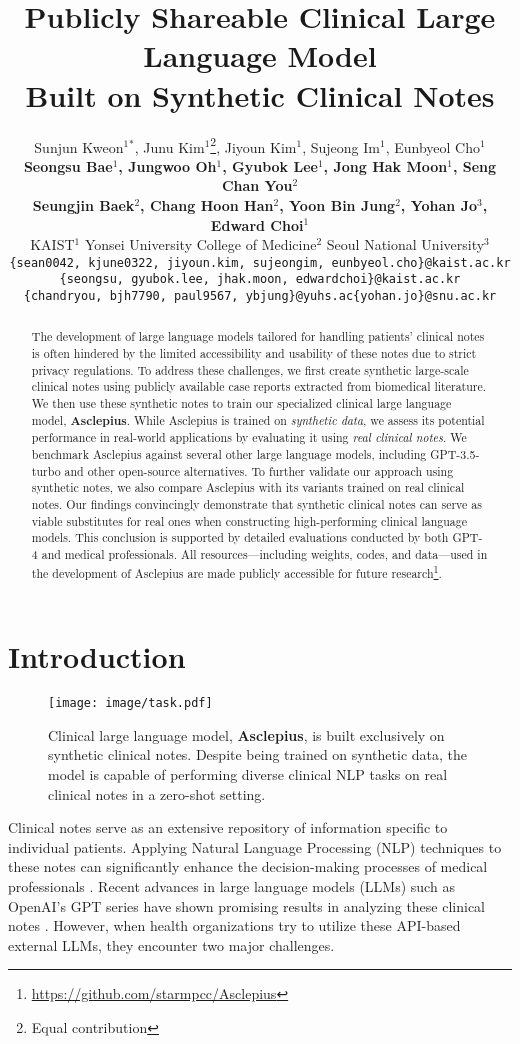 \documentclass[11pt]{article}
\title{Publicly Shareable Clinical Large Language Model\\Built on Synthetic Clinical Notes}
\author{Sunjun Kweon$^{1}$$^{*}$, Junu Kim$^{1}$\thanks{\hspace{0.2cm} Equal contribution}, Jiyoun Kim$^{1}$, Sujeong Im$^{1}$, Eunbyeol Cho$^{1}$\\
    \textbf{Seongsu Bae$^{1}$, Jungwoo Oh$^{1}$, Gyubok Lee$^{1}$, Jong Hak Moon$^{1}$, Seng Chan You$^{2}$}\\
    \textbf{Seungjin Baek$^{2}$, Chang Hoon Han$^{2}$, Yoon Bin Jung$^{2}$, Yohan Jo$^{3}$, Edward Choi$^{1}$}\\
  KAIST$^{1}$ Yonsei University College of Medicine$^{2}$ Seoul National University$^{3}$ \\
  \texttt{\{sean0042, kjune0322, jiyoun.kim, sujeongim, eunbyeol.cho\}@kaist.ac.kr}\\
  \texttt{\{seongsu, gyubok.lee, jhak.moon, edwardchoi\}@kaist.ac.kr}\\
  \texttt{\{chandryou, bjh7790, paul9567, ybjung\}@yuhs.ac}\hspace{0.5cm}\texttt{\{yohan.jo\}@snu.ac.kr} \\ 
  }
\begin{document}
\maketitle
\begin{abstract} 
The development of large language models tailored for handling patients’ clinical notes is often hindered by the limited accessibility and usability of these notes due to strict privacy regulations.
To address these challenges, we first create synthetic large-scale clinical notes using publicly available case reports extracted from biomedical literature.
We then use these synthetic notes to train our specialized clinical large language model, \textbf{Asclepius}.
While Asclepius is trained on \textit{synthetic data}, we assess its potential performance in real-world applications by evaluating it using \textit{real clinical notes}.
We benchmark Asclepius against several other large language models, including GPT-3.5-turbo and other open-source alternatives. 
To further validate our approach using synthetic notes, we also compare Asclepius with its variants trained on real clinical notes. 
Our findings convincingly demonstrate that synthetic clinical notes can serve as viable substitutes for real ones when constructing high-performing clinical language models. 
This conclusion is supported by detailed evaluations conducted by both GPT-4 and medical professionals. 
All resources—including weights, codes, and data—used in the development of Asclepius are made publicly accessible for future research\footnote{\url{https://github.com/starmpcc/Asclepius}}. 
\end{abstract}

\section{Introduction}

\begin{figure}
    \centering
    \texttt{[image: image/task.pdf]}
    \caption{Clinical large language model, \textbf{Asclepius}, is built exclusively on synthetic clinical notes. Despite being trained on synthetic data, the model is capable of performing diverse clinical NLP tasks on real clinical notes in a zero-shot setting.}
    \label{fig:task}
\end{figure}

Clinical notes serve as an extensive repository of information specific to individual patients. Applying Natural Language Processing (NLP) techniques to these notes can significantly enhance the decision-making processes of medical professionals \citep{demner2009can, lederman2022tasks, wu2022survey}.
Recent advances in large language models (LLMs) such as OpenAI's GPT series \citep{brown2020language,ouyang2022training,openai2023gpt4} have shown promising results in analyzing these clinical notes \citep{agrawal2022large, hu2023zero, liu2023deid, tang2023evaluating}.
However, when health organizations try to utilize these API-based external LLMs, they encounter two major challenges.
\end{document}
